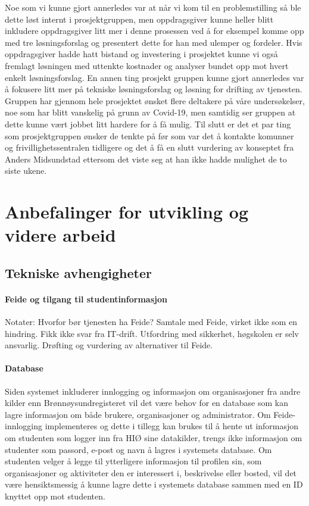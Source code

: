 Noe som vi kunne gjort annerledes var at når vi kom til en problemstilling så ble dette løst internt i prosjektgruppen, men oppdragsgiver kunne heller blitt inkludere oppdragsgiver litt mer i denne prosessen ved å for eksempel komme opp med tre løsningsforslag og presentert dette for han med ulemper og fordeler. Hvis oppdragsgiver hadde hatt bistand og investering i prosjektet kunne vi også fremlagt løsningen med uttenkte kostnader og analyser bundet opp mot hvert enkelt løsningsforslag. En annen ting prosjekt gruppen kunne gjort annerledes var å fokusere litt mer på tekniske løsningsforslag og løsning for drifting av tjenesten. Gruppen har gjennom hele prosjektet ønsket flere deltakere på våre undersøkelser, noe som har blitt vanskelig på grunn av Covid-19, men samtidig ser gruppen at dette kunne vært jobbet litt hardere for å få mulig. Til slutt er det et par ting som prosjektgruppen ønsker de tenkte på før som var det å kontakte komunner og frivillighetssentralen tidligere og det å få en slutt vurdering av konseptet fra Anders Midsundstad ettersom det viste seg at han ikke hadde mulighet de to siste ukene. 

\section{Anbefalinger for utvikling og videre arbeid}
\label{section:anbefaling-videre-utvikling}

\subsection{Tekniske avhengigheter}

\paragraph{Feide og tilgang til studentinformasjon}
Notater:
Hvorfor bør tjenesten ha Feide?
Samtale med Feide, virket ikke som en hindring.
Fikk ikke svar fra IT-drift.
Utfordring med sikkerhet, høgskolen er selv ansvarlig.
Drøfting og vurdering av alternativer til Feide.

\paragraph{Database}
Siden systemet inkluderer innlogging og informasjon om organisasjoner fra andre kilder enn Brønnøysundregisteret vil det være behov for en database som kan lagre informasjon om både brukere, organisasjoner og administrator. Om Feide-innlogging implementeres og dette i tillegg kan brukes til å hente ut informasjon om studenten som logger inn fra HIØ sine datakilder, trengs ikke informasjon om studenter som passord, e-post og navn å lagres i systemets database. Om studenten velger å legge til ytterligere informasjon til profilen sin, som organisasjoner og aktiviteter den er interessert i, beskrivelse eller bosted, vil det være hensiktsmessig å kunne lagre dette i systemets database sammen med en ID knyttet opp mot studenten.

